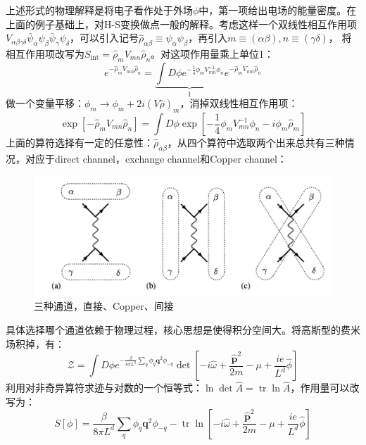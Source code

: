 \documentclass[10pt,openany]{book}
\theoremstyle{thmstyle} %
\theoremstyle{defstyle} %
\theoremstyle{prostyle} %
\begin{document}
上述形式的物理解释是将电子看作处于外场$ \phi $中，第一项给出电场的能量密度。在上面的例子基础上，对H-S变换做点一般的解释。考虑这样一个双线性相互作用项$ V_{\alpha \beta \gamma \delta} \bar{\psi}_\alpha \psi_\beta \bar{\psi}_\gamma \psi_\delta $，可以引入记号$ \hat{\rho}_{\alpha \beta} \equiv \psi_\alpha \psi_\beta $，再引入$ m \equiv(\alpha \beta), n \equiv(\gamma \delta) $， 将相互作用项改写为$ S_{\mathrm{int}}=\hat{\rho}_m V_{m n} \hat{\rho}_n $。对这项作用量乘上单位1：
\begin{equation}
  e^{-\hat{\rho}_m V_{m n} \hat{\rho}_n}=\underbrace{\int D \phi e^{-\frac{1}{4} \phi_m V_{m n}^{-1} \phi_n}}_1 e^{-\hat{\rho}_m V_{m n} \hat{\rho}_n}
\end{equation}   
做一个变量平移：$ \phi_m \rightarrow \phi_m+2 i(V \hat{\rho})_m $，消掉双线性相互作用项：
\begin{equation}
  \exp \left[-\hat{\rho}_m V_{m n} \hat{\rho}_n\right]=\int D \phi \exp \left[-\frac{1}{4} \phi_m V_{m n}^{-1} \phi_n-i \phi_m \hat{\rho}_m\right]
\end{equation} 
上面的算符选择有一定的任意性：$ \hat{\rho}_{\alpha \beta} $，从四个算符中选取两个出来总共有三种情况，对应于direct channel，exchange channel和Copper channel：
\begin{figure}[htbp]
  \centering
  \includegraphics*[scale=0.7]{Figures/channels.png}
  \caption{三种通道，直接、Copper、间接}
\end{figure} 
具体选择哪个通道依赖于物理过程，核心思想是使得积分空间大。将高斯型的费米场积掉，有：
\begin{equation}
  \mathcal{Z}=\int D \phi e^{-\frac{\beta}{8 \pi L^3} \sum_q \phi_q \mathbf{q}^2 \phi_{-q}} \operatorname{det}\left[-i \hat{\omega}+\frac{\hat{\mathbf{p}}^2}{2 m}-\mu+\frac{i e}{L^d} \hat{\phi}\right]
\end{equation}
利用对非奇异算符求迹与对数的一个恒等式：$ \ln \operatorname{det} \hat{A}=\operatorname{tr} \ln \hat{A} $，作用量可以改写为：
\begin{equation}
  S[\phi]=\frac{\beta}{8 \pi L^d} \sum_q \phi_q \mathbf{q}^2 \phi_{-q}-\operatorname{tr} \ln \left[-i \hat{\omega}+\frac{\hat{\mathbf{p}}^2}{2 m}-\mu+\frac{i e}{L^d} \hat{\phi}\right]
\end{equation}
\end{document}
